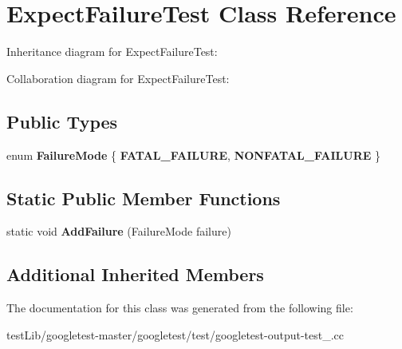 \hypertarget{classExpectFailureTest}{}\section{Expect\+Failure\+Test Class Reference}
\label{classExpectFailureTest}


Inheritance diagram for Expect\+Failure\+Test\+:


Collaboration diagram for Expect\+Failure\+Test\+:
\subsection*{Public Types}
\begin{DoxyCompactItemize}
\item 
\mbox{\label{classExpectFailureTest_aad05da10bb15d21a434eba3b37011406}} 
enum {\bfseries Failure\+Mode} \{ {\bfseries F\+A\+T\+A\+L\+\_\+\+F\+A\+I\+L\+U\+RE}, 
{\bfseries N\+O\+N\+F\+A\+T\+A\+L\+\_\+\+F\+A\+I\+L\+U\+RE}
 \}
\end{DoxyCompactItemize}
\subsection*{Static Public Member Functions}
\begin{DoxyCompactItemize}
\item 
\mbox{\label{classExpectFailureTest_ab9aeb7820ff7953fc2975ecc5abd046b}} 
static void {\bfseries Add\+Failure} (Failure\+Mode failure)
\end{DoxyCompactItemize}
\subsection*{Additional Inherited Members}


The documentation for this class was generated from the following file\+:\begin{DoxyCompactItemize}
\item 
test\+Lib/googletest-\/master/googletest/test/googletest-\/output-\/test\+\_\+.\+cc\end{DoxyCompactItemize}

